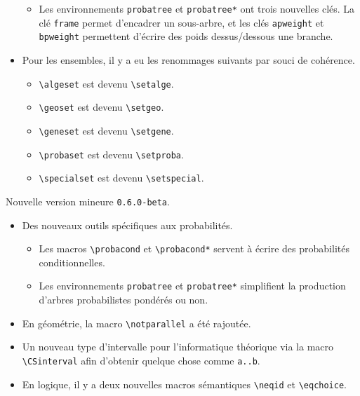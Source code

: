 \documentclass[12pt,a4paper]{article}
\theoremstyle{definition}
\begin{document}
\begin{description}[leftmargin=1em]
\begin{itemize}
\begin{itemize}
        	\item Les environnements \verb+probatree+ et \verb+probatree*+ ont trois nouvelles clés.
			      La clé \verb+frame+ permet d'encadrer un sous-arbre, et les clés \verb+apweight+ et \verb+bpweight+ permettent d'écrire des poids dessus/dessous une branche.
        \end{itemize}
    
        \item Pour les ensembles, il y a eu les renommages suivants par souci de cohérence.
        \begin{itemize}
        	\item \verb+\algeset+ est devenu \verb+\setalge+.
        	\item \verb+\geoset+ est devenu \verb+\setgeo+.
        	\item \verb+\geneset+ est devenu \verb+\setgene+.
        	\item \verb+\probaset+ est devenu \verb+\setproba+.
        	\item \verb+\specialset+ est devenu \verb+\setspecial+.
        \end{itemize}
    \end{itemize}  
    


    \item[2019-10-10] Nouvelle version mineure \verb+0.6.0-beta+.
    \begin{itemize}
        \item Des nouveaux outils spécifiques aux probabilités.
        \begin{itemize}
            \item Les macros \verb+\probacond+ et \verb+\probacond*+ servent à écrire des probabilités conditionnelles.

            \item Les environnements \verb+probatree+ et \verb+probatree*+ simplifient la production d'arbres probabilistes pondérés ou non.
        \end{itemize}

        \item En géométrie, la macro \verb+\notparallel+ a été rajoutée.

        \item Un nouveau type d'intervalle pour l'informatique théorique via la macro \verb+\CSinterval+ afin d'obtenir quelque chose comme \verb+a..b+.

        \item En logique, il y a deux nouvelles macros sémantiques \verb+\neqid+ et \verb+\eqchoice+.
    \end{itemize}



\end{description}
\end{document}
